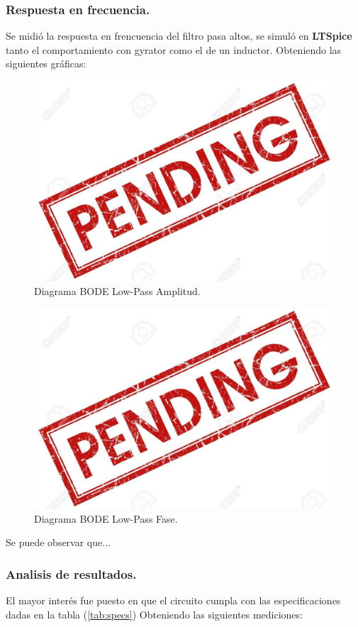 \documentclass[a4paper]{article}
\begin{document}
\subsubsection{Respuesta en frecuencia.}
Se midió la respuesta en frencuencia del filtro pasa altos, se simuló en \textbf{LTSpice}  tanto el comportamiento con gyrator como el de un inductor. Obteniendo las siguientes gráficas:
\begin{figure}[H]	
	\centering
	\includegraphics[width=\textwidth]{ImagenesEj2/bodelp.jpg}
	\caption{Diagrama BODE Low-Pass Amplitud.}
	\label{fig:bodelp}
\end{figure}
\begin{figure}[H]	
	\centering
	\includegraphics[width=\textwidth]{ImagenesEj2/bodelpp.jpg}
	\caption{Diagrama BODE Low-Pass Fase.}
	\label{fig:bodelpp}
\end{figure}
Se puede observar que...
\subsubsection{Analisis de resultados.}
El mayor interés fue puesto en que el circuito cumpla con las especificaciones dadas en la tabla (\ref{tab:specs})
Obteniendo las siguientes mediciones:
\end{document}
